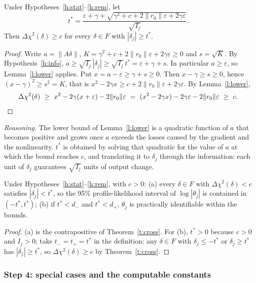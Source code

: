 \begin{stheorem}\label{t:cross}
Under Hypotheses~\ref{h:stat}--\ref{h:rem}, let
\[ t^{\ast}=\frac{\varepsilon+\gamma+\sqrt{\gamma^2+c+2\|r_0\|\varepsilon+2\gamma\varepsilon}}{\sqrt{I_j}} . \]
Then $\Delta\chi^2(\delta)\ge c$ for every $\delta\in F$ with $|\delta_j|\ge t^{\ast}$.
\end{stheorem}
\begin{proof}
Write $a=\|A\delta\|$, $K=\gamma^2+c+2\|r_0\|\varepsilon+2\gamma\varepsilon\ge0$ and $s=\sqrt K$. By Hypothesis~\ref{h:info}, $a\ge\sqrt{I_j}\,|\delta_j|\ge\sqrt{I_j}\,t^{\ast}=\varepsilon+\gamma+s$. In particular $a\ge\varepsilon$, so Lemma~\ref{l:lower} applies. Put $x=a-\varepsilon\ge\gamma+s\ge0$. Then $x-\gamma\ge s\ge0$, hence $(x-\gamma)^2\ge s^2=K$, that is $x^2-2\gamma x\ge c+2\|r_0\|\varepsilon+2\gamma\varepsilon$. By Lemma~\ref{l:lower},
\[ \Delta\chi^2(\delta)\ \ge\ x^2-2\gamma(x+\varepsilon)-2\|r_0\|\varepsilon\ =\ (x^2-2\gamma x)-2\gamma\varepsilon-2\|r_0\|\varepsilon\ \ge\ c . \qedhere \]
\end{proof}
\emph{Reasoning.} The lower bound of Lemma~\ref{l:lower} is a quadratic function of $a$ that becomes positive and grows once $a$ exceeds the losses caused by the gradient and the nonlinearity. $t^{\ast}$ is obtained by solving that quadratic for the value of $a$ at which the bound reaches $c$, and translating it to $\delta_j$ through the information: each unit of $\delta_j$ guarantees $\sqrt{I_j}$ units of output change.

\begin{scorollary}\label{c:ident}
Under Hypotheses~\ref{h:stat}--\ref{h:rem}, with $c>0$: (a) every $\delta\in F$ with $\Delta\chi^2(\delta)<c$ satisfies $|\delta_j|<t^{\ast}$, so the 95\% profile-likelihood interval of $\log|\theta_j|$ is contained in $(-t^{\ast},t^{\ast})$; (b) if $t^{\ast}<d_-$ and $t^{\ast}<d_+$, $\theta_j$ is practically identifiable within the bounds.
\end{scorollary}
\begin{proof}
(a) is the contrapositive of Theorem~\ref{t:cross}. For (b), $t^{\ast}>0$ because $c>0$ and $I_j>0$; take $t_-=t_+=t^{\ast}$ in the definition: any $\delta\in F$ with $\delta_j\le-t^{\ast}$ or $\delta_j\ge t^{\ast}$ has $|\delta_j|\ge t^{\ast}$, so $\Delta\chi^2(\delta)\ge c$ by Theorem~\ref{t:cross}.
\end{proof}

\subsubsection*{Step 4: special cases and the computable constants}

